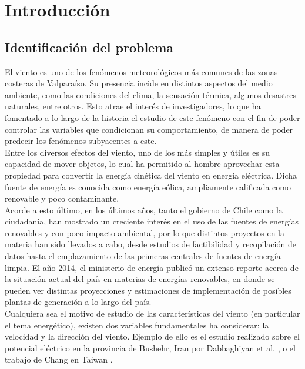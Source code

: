 
\chapter{Introducción}

\section{Identificación del problema}
El viento es uno de los fenómenos meteorológicos más comunes de las zonas costeras de Valparaíso. Su presencia incide en distintos aspectos del medio ambiente, como las condiciones del clima, la sensación térmica, algunos desastres naturales, entre otros. Esto atrae el interés de investigadores, lo que ha fomentado
a lo largo de la historia el estudio de este fenómeno con el fin de poder controlar las variables que condicionan su comportamiento, de manera de poder predecir los fenómenos subyacentes a este.\\ 
Entre los diversos efectos del viento, uno de los más simples y útiles es su capacidad de mover objetos, lo cual ha permitido al hombre aprovechar esta propiedad para convertir la energía cinética del viento en energía eléctrica. Dicha fuente de energía es conocida como energía eólica, ampliamente calificada como renovable y poco contaminante.\\
Acorde a esto último, en los últimos años, tanto el gobierno de Chile como la ciudadanía, han mostrado un creciente interés en el uso de las fuentes de energías renovables y con poco impacto ambiental, por lo que distintos proyectos en la materia han sido llevados a cabo, desde estudios de factibilidad y recopilación de datos hasta el emplazamiento de las primeras centrales de fuentes de energía limpia. El año 2014, el ministerio de energía publicó un extenso reporte acerca de la situación actual del país en materias de energías renovables, en donde se pueden ver distintas proyecciones y estimaciones de implementación de posibles plantas de generación a lo largo del país. \cite{minenergia14}\\
Cualquiera sea el motivo de estudio de las características del viento (en particular el tema energético), existen dos variables fundamentales ha considerar: la velocidad y la dirección del viento. Ejemplo de ello es el estudio realizado sobre el potencial eléctrico en la provincia de Bushehr, Iran por Dabbaghiyan et al. \cite{Dabbaghiyan15}, o el trabajo de Chang en Taiwan \cite{Chang10_2}.\\ 
